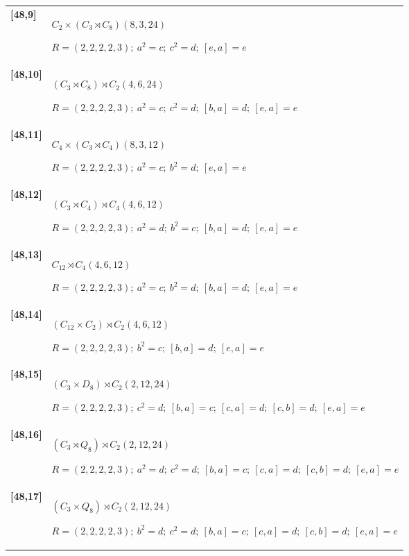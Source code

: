 \documentclass[UTF8,fontset=fandol,11pt,a4paper]{ctexart}
\begin{document}
\begin{longtable}{@{}p{17mm}>{\raggedright\arraybackslash}p{141mm}@{}}
\textbf{[48,9]} & $C_{2}\times (C_{3}\rtimes C_{8})$\quad $(8,3,24)$\par\(R=(2,2,2,2,3);\allowbreak\ a^{2}=c;\allowbreak\ c^{2}=d;\allowbreak\ [e,a]=e\)\\[3pt]

\textbf{[48,10]} & $(C_{3}\rtimes C_{8})\rtimes C_{2}$\quad $(4,6,24)$\par\(R=(2,2,2,2,3);\allowbreak\ a^{2}=c;\allowbreak\ c^{2}=d;\allowbreak\ [b,a]=d;\allowbreak\ [e,a]=e\)\\[3pt]

\textbf{[48,11]} & $C_{4}\times (C_{3}\rtimes C_{4})$\quad $(8,3,12)$\par\(R=(2,2,2,2,3);\allowbreak\ a^{2}=c;\allowbreak\ b^{2}=d;\allowbreak\ [e,a]=e\)\\[3pt]

\textbf{[48,12]} & $(C_{3}\rtimes C_{4})\rtimes C_{4}$\quad $(4,6,12)$\par\(R=(2,2,2,2,3);\allowbreak\ a^{2}=d;\allowbreak\ b^{2}=c;\allowbreak\ [b,a]=d;\allowbreak\ [e,a]=e\)\\[3pt]

\textbf{[48,13]} & $C_{12}\rtimes C_{4}$\quad $(4,6,12)$\par\(R=(2,2,2,2,3);\allowbreak\ a^{2}=c;\allowbreak\ b^{2}=d;\allowbreak\ [b,a]=d;\allowbreak\ [e,a]=e\)\\[3pt]

\textbf{[48,14]} & $(C_{12}\times C_{2})\rtimes C_{2}$\quad $(4,6,12)$\par\(R=(2,2,2,2,3);\allowbreak\ b^{2}=c;\allowbreak\ [b,a]=d;\allowbreak\ [e,a]=e\)\\[3pt]

\textbf{[48,15]} & $(C_{3}\times D_{8})\rtimes C_{2}$\quad $(2,12,24)$\par\(R=(2,2,2,2,3);\allowbreak\ c^{2}=d;\allowbreak\ [b,a]=c;\allowbreak\ [c,a]=d;\allowbreak\ [c,b]=d;\allowbreak\ [e,a]=e\)\\[3pt]

\textbf{[48,16]} & $(C_{3}\rtimes Q_{8})\rtimes C_{2}$\quad $(2,12,24)$\par\(R=(2,2,2,2,3);\allowbreak\ a^{2}=d;\allowbreak\ c^{2}=d;\allowbreak\ [b,a]=c;\allowbreak\ [c,a]=d;\allowbreak\ [c,b]=d;\allowbreak\ [e,a]=e\)\\[3pt]

\textbf{[48,17]} & $(C_{3}\times Q_{8})\rtimes C_{2}$\quad $(2,12,24)$\par\(R=(2,2,2,2,3);\allowbreak\ b^{2}=d;\allowbreak\ c^{2}=d;\allowbreak\ [b,a]=c;\allowbreak\ [c,a]=d;\allowbreak\ [c,b]=d;\allowbreak\ [e,a]=e\)\\[3pt]


\end{longtable}
\end{document}

